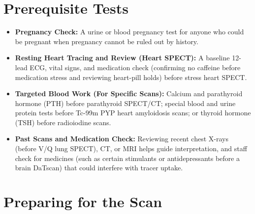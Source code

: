 \section{Prerequisite Tests}

\begin{itemize}
    \item \textbf{Pregnancy Check:} A urine or blood pregnancy test for anyone who could be pregnant when pregnancy cannot be ruled out by history.
    \item \textbf{Resting Heart Tracing and Review (Heart SPECT):} A baseline 12-lead ECG, vital signs, and medication check (confirming no caffeine before medication stress and reviewing heart-pill holds) before stress heart SPECT.
    \item \textbf{Targeted Blood Work (For Specific Scans):} Calcium and parathyroid hormone (PTH) before parathyroid SPECT/CT; special blood and urine protein tests before Tc-99m PYP heart amyloidosis scans; or thyroid hormone (TSH) before radioiodine scans.
    \item \textbf{Past Scans and Medication Check:} Reviewing recent chest X-rays (before V/Q lung SPECT), CT, or MRI helps guide interpretation, and staff check for medicines (such as certain stimulants or antidepressants before a brain DaTscan) that could interfere with tracer uptake.
\end{itemize}

\section{Preparing for the Scan}

